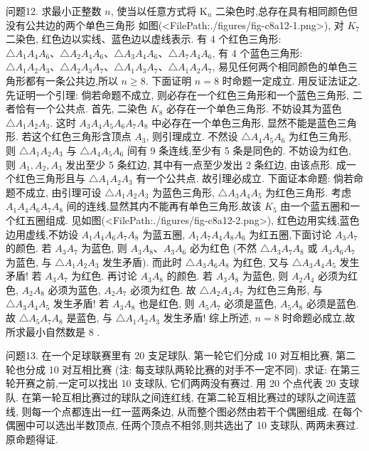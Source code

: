 问题12. 求最小正整数 $n$, 使当以任意方式将 $\mathrm{K}_{n}$ 二染色时,总存在具有相同颜色但没有公共边的两个单色三角形
如图(<FilePath:./figures/fig-c8a12-1.png>),  对 $K_7$ 二染色, 红色边以实线、蓝色边以虚线表示.
有 4 个红色三角形: $\triangle A_1 A_4 A_6 、 \triangle A_2 A_4 A_6 、 \triangle A_3 A_4 A_6 、 \triangle A_7 A_4 A_6$, 有 4 个蓝色三角形: $\triangle A_1 A_2 A_3 、 \triangle A_2 A_3 A_7 、 \triangle A_1 A_3 A_7 、 \triangle A_1 A_2 A_7$, 易见任何两个相同颜色的单色三角形都有一条公共边,所以 $n \geqslant 8$.
下面证明 $n=8$ 时命题一定成立.
用反证法证之.
先证明一个引理: 倘若命题不成立, 则必存在一个红色三角形和一个蓝色三角形, 二者恰有一个公共点.
首先, 二染色 $K_8$ 必存在一个单色三角形.
不妨设其为蓝色 $\triangle A_1 A_2 A_3$. 这时 $A_3 A_4 A_5 A_6 A_7 A_8$ 中必存在一个单色三角形, 显然不能是蓝色三角形.
若这个红色三角形含顶点 $A_3$, 则引理成立.
不然设 $\triangle A_4 A_5 A_6$ 为红色三角形, 则 $\triangle A_1 A_2 A_3$ 与 $\triangle A_4 A_5 A_6$ 间有 9 条连线,至少有 5 条是同色的.
不妨设为红色, 则 $A_1, A_2, A_3$ 发出至少 5 条红边, 其中有一点至少发出 2 条红边, 由该点形.
成一个红色三角形且与 $\triangle A_1 A_2 A_3$ 有一个公共点.
故引理必成立.
下面证本命题: 倘若命题不成立, 由引理可设 $\triangle A_1 A_2 A_3$ 为蓝色三角形, $\triangle A_3 A_4 A_5$ 为红色三角形.
考虑 $A_1 A_4 A_6 A_7 A_8$ 间的连线,显然其内不能再有单色三角形,故该 $K_5$ 由一个蓝五圈和一个红五圈组成.
见如图(<FilePath:./figures/fig-c8a12-2.png>), 红色边用实线,蓝色边用虚线,不妨设 $A_1 A_4 A_6 A_7 A_8$ 为蓝五圈, $A_1 A_7 A_4 A_8 A_6$ 为红五圈,下面讨论 $A_3 A_7$ 的颜色.
若 $A_3 A_7$ 为蓝色, 则 $A_3 A_8 、 A_3 A_6$ 必为红色 (不然 $\triangle A_3 A_7 A_8$ 或 $A_3 A_6 A_7$ 为蓝色, 与 $\triangle A_1 A_2 A_3$ 发生矛盾). 而此时 $\triangle A_3 A_6 A_8$ 为红色, 又与 $\triangle A_3 A_4 A_5$ 发生矛盾!
若 $A_3 A_7$ 为红色.
再讨论 $A_3 A_8$ 的颜色.
若 $A_3 A_8$ 为蓝色, 则 $A_2 A_4$ 必须为红色, $A_2 A_8$ 必须为蓝色, $A_2 A_7$ 必须为红色.
故 $\triangle A_2 A_4 A_7$ 为红色三角形, 与 $\triangle A_3 A_4 A_5$ 发生矛盾!
若 $A_3 A_8$ 也是红色, 则 $A_5 A_7$ 必须是蓝色, $A_5 A_8$ 必须是蓝色.
故 $\triangle A_5 A_7 A_8$ 是蓝色, 与 $\triangle A_1 A_2 A_3$ 发生矛盾!
综上所述, $n=8$ 时命题必成立,故所求最小自然数是 8 .



问题13. 在一个足球联赛里有 20 支足球队.
第一轮它们分成 10 对互相比赛, 第二轮也分成 10 对互相比赛 (注: 每支球队两轮比赛的对手不一定不同). 求证: 在第三轮开赛之前,一定可以找出 10 支球队, 它们两两没有赛过.
用 20 个点代表 20 支球队.
在第一轮互相比赛过的球队之间连红线, 在第二轮互相比赛过的球队之间连蓝线, 则每一个点都连出一红一蓝两条边, 从而整个图必然由若干个偶圈组成.
在每个偶圈中可以选出半数顶点, 任两个顶点不相邻,则共选出了 10 支球队, 两两未赛过.
原命题得证.


